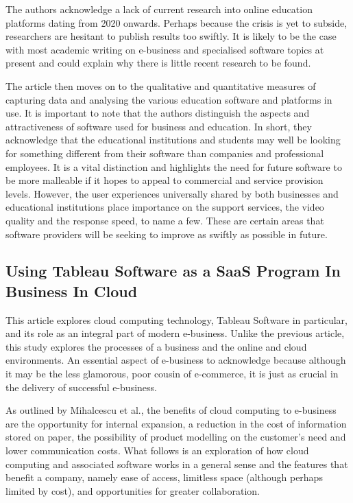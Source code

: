 \documentclass[12pt]{article}
\begin{document}
The authors acknowledge a lack of current research into online education platforms dating from 2020 onwards. Perhaps because the crisis is yet to subside, researchers are hesitant to publish results too swiftly. It is likely to be the case with most academic writing on e-business and specialised software topics at present and could explain why there is little recent research to be found. \par 

The article then moves on to the qualitative and quantitative measures of capturing data and analysing the various education software and platforms in use. It is important to note that the authors distinguish the aspects and attractiveness of software used for business and education. In short, they acknowledge that the educational institutions and students may well be looking for something different from their software than companies and professional employees. It is a vital distinction and highlights the need for future software to be more malleable if it hopes to appeal to commercial and service provision levels. However, the user experiences universally shared by both businesses and educational institutions place importance on the support services, the video quality and the response speed, to name a few. These are certain areas that software providers will be seeking to improve as swiftly as possible in future. \par 

\subsection{Using Tableau Software as a SaaS Program In Business In Cloud \\ \cite{mihalcescu}}
This article explores cloud computing technology, Tableau Software in particular, and its role as an integral part of modern e-business. Unlike the previous article, this study explores the processes of a business and the online and cloud environments. An essential aspect of e-business to acknowledge because although it may be the less glamorous, poor cousin of e-commerce, it is just as crucial in the delivery of successful e-business. \par 

As outlined by Mihalcescu et al., the benefits of cloud computing to e-business are the opportunity for internal expansion, a reduction in the cost of information stored on paper, the possibility of product modelling on the customer’s need and lower communication costs. What follows is an exploration of how cloud computing and associated software works in a general sense and the features that benefit a company, namely ease of access, limitless space (although perhaps limited by cost), and opportunities for greater collaboration. \par 
\end{document}
